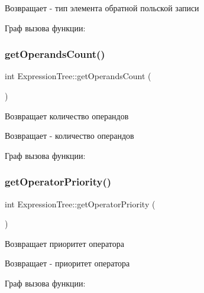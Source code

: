 \begin{DoxyReturn}{Возвращает}
-\/ тип элемента обратной польской записи 
\end{DoxyReturn}
Граф вызова функции\+:
\mbox{\label{class_expression_tree_a8b072f45d0e8dbcd9aa7159c10792407}} 
\subsubsection{\texorpdfstring{get\+Operands\+Count()}{getOperandsCount()}}
{\footnotesize\ttfamily int Expression\+Tree\+::get\+Operands\+Count (\begin{DoxyParamCaption}{ }\end{DoxyParamCaption})}



Возвращает количество операндов 

\begin{DoxyReturn}{Возвращает}
-\/ количество операндов 
\end{DoxyReturn}
Граф вызова функции\+:
\mbox{\label{class_expression_tree_a1456f080f1d7f83cced830dc98f22d20}} 
\subsubsection{\texorpdfstring{get\+Operator\+Priority()}{getOperatorPriority()}}
{\footnotesize\ttfamily int Expression\+Tree\+::get\+Operator\+Priority (\begin{DoxyParamCaption}{ }\end{DoxyParamCaption})}



Возвращает приоритет оператора 

\begin{DoxyReturn}{Возвращает}
-\/ приоритет оператора 
\end{DoxyReturn}
Граф вызова функции\+:
\mbox{\label{class_expression_tree_a2ba380c9b6d05a259f7827269cce4aea}} 
